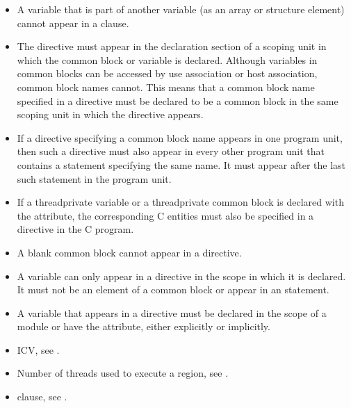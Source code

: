 \begin{fortranspecific}
\begin{itemize} %
\item A variable that is part of another variable (as an array or structure element) cannot
appear in a  clause.

\item The  directive must appear in the declaration section of a scoping
unit in which the common block or variable is declared. Although variables in
common blocks can be accessed by use association or host association, common
block names cannot. This means that a common block name specified in a
 directive must be declared to be a common block in the same
scoping unit in which the  directive appears.

\item If a  directive specifying a common block name appears in one
program unit, then such a directive must also appear in every other program unit that
contains a  statement specifying the same name. It must appear after the last
such  statement in the program unit.

\item If a threadprivate variable or a threadprivate common block is declared
with the  attribute, the corresponding C entities must also be specified in a
 directive in the C program.

\item A blank common block cannot appear in a  directive.

\item A variable can only appear in a  directive in the scope in which it
is declared. It must not be an element of a common block or appear in an
 statement.

\item A variable that appears in a  directive must be declared in the
scope of a module or have the  attribute, either explicitly or implicitly.
\end{itemize} %
\end{fortranspecific}
%
\crossreferences
\begin{itemize}
\item {} ICV, see
.

\item Number of threads used to execute a  region, see
.

\item {} clause, see
.
\end{itemize}








